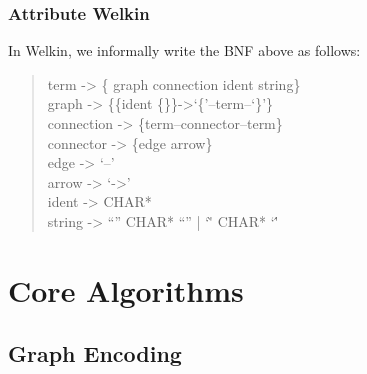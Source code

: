 
\subsubsection*{Attribute Welkin}

In Welkin, we informally write the BNF above as follows:
\begin{quote}{\ttfamily \raggedright \noindent
	term -> \{ graph connection ident string\}\\
	graph -> \{\{ident \{\}\}->`\{'--term--`\}'\}\\
	connection -> \{term--connector--term\}\\
	connector -> \{edge arrow\}\\
	edge -> `--'\\
	arrow -> `->'\\
	ident -> CHAR*\\
	string -> ``'' CHAR* ``'' | `\`' CHAR* `\''
}\end{quote}

\section{Core Algorithms}

\subsection{Graph Encoding}



\label{ch:spec}
